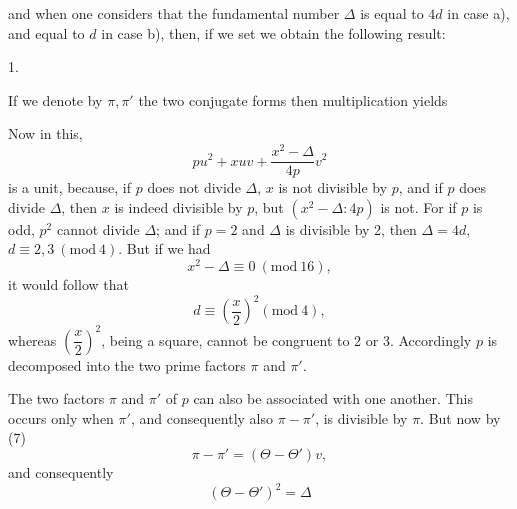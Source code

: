 and when one considers that the fundamental number $\Delta$ is equal to $4d$ in case a), and equal to $d$ in case b), then, if we set
we obtain the following result:

1. 

If we denote by $\pi, \pi'$ the two conjugate forms
then multiplication yields

Now in this,
\[
pu^2 + xuv + \frac{x^2-\Delta}{4p}v^2
\]
is a unit, because, if $p$ does not divide $\Delta$, $x$ is not divisible by $p$, and if $p$ does divide $\Delta$, then $x$ is indeed divisible by $p$, but $(x^2-\Delta:4p)$ is not. For if $p$ is odd, $p^2$ cannot divide $\Delta$; and if $p=2$ and $\Delta$ is divisible by 2, then $\Delta = 4d$, $d \equiv 2, 3\ (\mathrm{mod}\ 4)$. But if we had
\[
x^2 - \Delta \equiv 0\ (\mathrm{mod}\ 16),
\]
it would follow that
\[
d \equiv \left(\frac{x}{2}\right)^2 (\mathrm{mod}\ 4),
\]
whereas $\left(\dfrac{x}{2}\right)^2$, being a square, cannot be congruent to 2 or 3. Accordingly $p$ is decomposed into the two prime factors $\pi$ and $\pi'$.

The two factors $\pi$ and $\pi'$ of $p$ can also be associated with one another. This occurs only when $\pi'$, and consequently also $\pi - \pi'$, is divisible by $\pi$. But now by (7)
\[
\pi - \pi' = (\Theta - \Theta')v,
\]
and consequently
\[
(\Theta - \Theta')^2 = \Delta
\]
